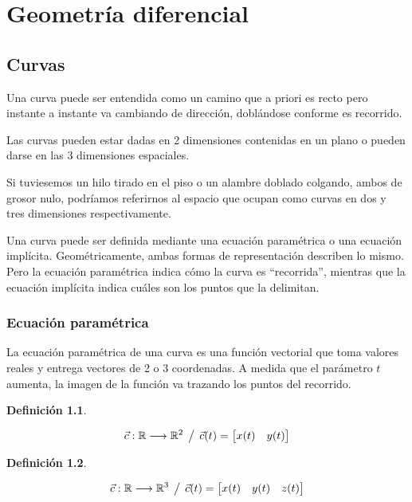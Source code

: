 \documentclass[a5paper,12pt,twoside]{book}
\newtheorem{defn}{{Definición}}[chapter]
\begin{document}
\chapter{Geometría diferencial}


\section{Curvas}


Una curva puede ser entendida como un camino que a priori es recto pero instante a instante va cambiando de dirección, doblándose conforme es recorrido.

Las curvas pueden estar dadas en 2 dimensiones contenidas en un plano o pueden darse en las 3 dimensiones espaciales.

Si tuviesemos un hilo tirado en el piso o un alambre doblado colgando, ambos de grosor nulo, podríamos referirnos al espacio que ocupan como curvas en dos y tres dimensiones respectivamente.

Una curva puede ser definida mediante una ecuación paramétrica o una ecuación implícita.
Geométricamente, ambas formas de representación describen lo mismo.
Pero la ecuación paramétrica indica cómo la curva es ``recorrida'', mientras que la ecuación implícita indica cuáles son los puntos que la delimitan.


\subsection{Ecuación paramétrica}

La ecuación paramétrica de una curva es una función vectorial que toma valores reales y entrega vectores de 2 o 3 coordenadas.
A medida que el parámetro $t$ aumenta, la imagen de la función va trazando los puntos del recorrido.

\begin{mdframed}[style=DefinitionFrame]
    \begin{defn}
    \end{defn}
    \begin{equation*}
        \Vec{c}: \mathbb{R} \longrightarrow \mathbb{R}^2 \hspace{1ex} \big/ \hspace{1ex} \Vec{c}(t) = \begin{bmatrix} x(t) & y(t) \end{bmatrix}
    \end{equation*}
\end{mdframed}

\begin{mdframed}[style=DefinitionFrame]
    \begin{defn}
    \end{defn}
    \begin{equation*}
        \Vec{c}: \mathbb{R} \longrightarrow \mathbb{R}^3 \hspace{1ex} \big/ \hspace{1ex} \Vec{c}(t) = \begin{bmatrix} x(t) & y(t) & z(t) \end{bmatrix}
    \end{equation*}
\end{mdframed}
\end{document}
